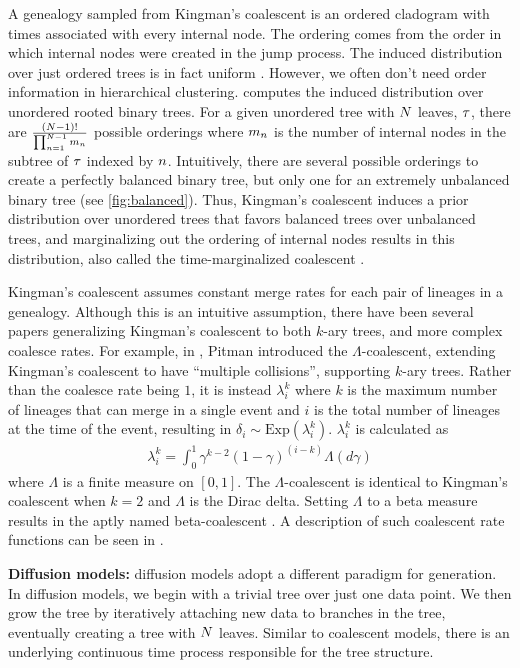 A genealogy sampled from Kingman's coalescent
is an ordered cladogram with times associated with every internal node.
The ordering comes from the order in which
internal nodes were created in the jump process.
The induced distribution over just ordered trees
is in fact uniform \citep{Teh2008}.
However, we often don't need order information
in hierarchical clustering.
\citet{Boyles2012} computes the induced distribution over
unordered rooted binary trees.
For a given unordered tree with $N$ leaves, $\tau$,
there are $\frac{(N - 1)!}{\prod_{n = 1}^{N - 1}m_n}$ possible orderings
where $m_n$ is the number of internal nodes in the subtree
of $\tau$ indexed by $n$. 
Intuitively, there
are several possible orderings to create a perfectly balanced binary tree,
but only one for an extremely unbalanced binary tree (see \autoref{fig:balanced}).
Thus, Kingman's coalescent induces a prior distribution
over unordered trees
that favors balanced trees over unbalanced trees,
and 
marginalizing out the ordering of internal
nodes results in this distribution, also called
the time-marginalized coalescent \citep[TMC; ][]{Boyles2012}.

Kingman's coalescent assumes constant merge rates
for each pair of lineages in a genealogy. 
Although this is an intuitive assumption,
there have been several papers generalizing Kingman's coalescent
to both $k$-ary trees, and more complex coalesce rates.
For example, in \citet{Pitman1999}, Pitman introduced the
$\Lambda$-coalescent, extending Kingman's coalescent
to have ``multiple collisions'', supporting
$k$-ary trees.
Rather than the coalesce rate
being $1$, it is instead $\lambda_i^k$
where $k$ is the maximum number of lineages
that can merge in a single event and $i$ is the total number
of lineages at the time of the event, resulting in $\delta_i \sim \text{Exp}(\lambda_i^k)$. $\lambda_i^k$ is calculated as
\begin{align}
  \lambda_i^k = \int_0^1 \gamma^{k - 2}(1 - \gamma)^{(i-k)}\Lambda(d\gamma)
\end{align}
where $\Lambda$ is a finite measure on $[0, 1]$. The
$\Lambda$-coalescent is identical to Kingman's coalescent
when $k = 2$ and $\Lambda$ is the Dirac delta.
Setting $\Lambda$ to a beta measure
results in the aptly named beta-coalescent \citep{Hu2013}.
A description of such coalescent rate functions
can be seen in \citet{Aldous1999}.

\textbf{Diffusion models:}
diffusion models adopt a different paradigm for generation.
In diffusion models, we begin with a
trivial tree over just one data point. We then
grow the tree by iteratively attaching new data
to branches in the tree, eventually creating
a tree with $N$ leaves.
Similar to coalescent models, there is an underlying
continuous time process responsible for
the tree structure.

